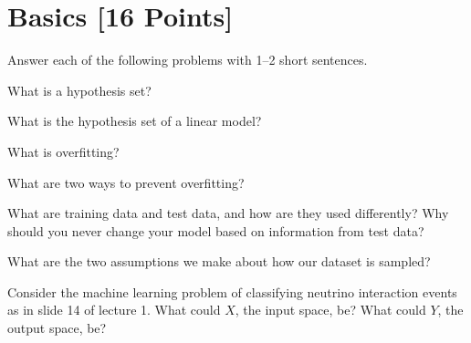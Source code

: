 \newpage
\section{Basics [16 Points]}

Answer each of the following problems with 1--2 short sentences.

\begin{problem}[2]
What is a hypothesis set?
\end{problem}
\begin{solution}

\end{solution}

\begin{problem}[2]
What is the hypothesis set of a linear model?
\end{problem}
\begin{solution}

\end{solution}

\begin{problem}[2]
What is overfitting?
\end{problem}
\begin{solution}

\end{solution}

\begin{problem}[2]
What are two ways to prevent overfitting?
\end{problem}
\begin{solution}

\end{solution}

\begin{problem}[2]
What are training data and test data, and how are they used differently?
Why should you never change your model based on information from test data?
\end{problem}
\begin{solution}

\end{solution}

\begin{problem}[2]
What are the two assumptions we make about how our dataset is sampled?
\end{problem}
\begin{solution}

\end{solution}

\begin{problem}[2]
Consider the machine learning problem of classifying neutrino interaction events as in slide 14 of lecture 1.
What could $X$, the input space, be? What could $Y$, the output space, be?
\end{problem}
\begin{solution}

\end{solution}

